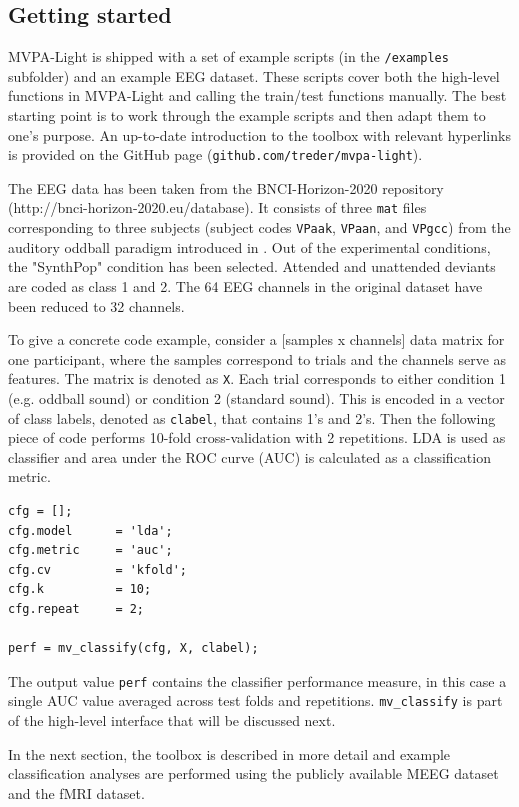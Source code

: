 \documentclass[utf8]{frontiersSCNS} %
\newcommand{\ttt}[1]{\texttt{#1}}
\begin{document}
\subsection{Getting started}

MVPA-Light is shipped with a set of example scripts (in the \ttt{/examples} subfolder) and an example EEG dataset. These scripts cover both the high-level functions in MVPA-Light and calling the train/test functions manually. The best starting point is to work through the example scripts and then adapt them to one's purpose. An up-to-date introduction to the toolbox with relevant hyperlinks is provided on the GitHub page (\ttt{github.com/treder/mvpa-light}).

The EEG data has been taken from the  BNCI-Horizon-2020 repository (http://bnci-horizon-2020.eu/database). It consists of three \ttt{mat} files corresponding to three subjects (subject codes \ttt{VPaak}, \ttt{VPaan}, and \ttt{VPgcc}) from the auditory oddball paradigm introduced in \cite{Treder2014}. Out of the experimental conditions, the "SynthPop" condition has been selected. Attended and unattended deviants are coded as class 1 and 2. The 64 EEG channels in the original dataset have been reduced to 32 channels.

To give a concrete code example, consider a [samples x channels] data matrix for one participant, where the samples correspond to trials and the channels serve as features. The matrix is denoted as \ttt{X}. Each trial corresponds to either condition 1 (e.g. oddball sound) or condition 2 (standard sound). This is encoded in a vector of class labels, denoted as \ttt{clabel}, that contains 1's and 2's. Then the following piece of code performs 10-fold cross-validation with 2 repetitions. LDA is used as classifier and area under the ROC curve (AUC) is calculated as a classification metric.

\begin{verbatim}
cfg = [];
cfg.model      = 'lda';
cfg.metric     = 'auc';
cfg.cv         = 'kfold';
cfg.k          = 10;
cfg.repeat     = 2;

perf = mv_classify(cfg, X, clabel);
\end{verbatim}

The output value \ttt{perf} contains the classifier performance measure, in this case a single AUC value averaged across test folds and repetitions. \ttt{mv\_classify} is part of the high-level interface that will be discussed next.

In the next section, the toolbox is described in more detail and example classification analyses are performed using the publicly available \cite{Wakeman2014OpenfMRI,Wakeman2015ADataset} MEEG dataset and the \cite{Haxby2001} fMRI dataset.
\end{document}
